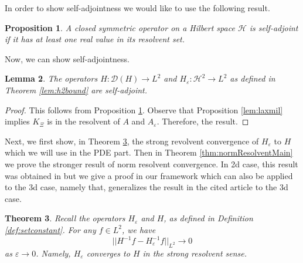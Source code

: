 \documentclass[11pt, oneside]{article}   	%
\newtheorem{theorem}{Theorem}[section]
\newtheorem{lemma}[theorem]{Lemma}
\newtheorem{proposition}[theorem]{Proposition}
\newcommand{\ssp}{\mathscr{H}}
\begin{document}
	In order to show self-adjointness we would like to use the following result.

\begin{proposition}\cite[X.1]{reedsimon2} \label{prop:selfadj}
	A closed symmetric operator on a Hilbert space $\mathcal{H}$ is self-adjoint if it has at least one real value in its resolvent set.
\end{proposition}

Now, we can show self-adjointness.  

\begin{lemma}
	\label{thm:2dselfadj}The operators $H : \mathscr{D}(H)
	\rightarrow L^2$ and $H_\varepsilon : \ssp^2
	\rightarrow L^2$ as defined in Theorem \ref{lem:h2bound} are self-adjoint.
\end{lemma}

\begin{proof}
	This follows from Proposition \ref{prop:selfadj}. Observe that Proposition \ref{lem:laxmil} implies  $K_\Xi$ is in the resolvent of $A$ and $A_\varepsilon$. Therefore, the result.
\end{proof}



Next, we first show, in Theorem \ref{thm:resoventConv1},  the strong  revolvent convergence of $H_\varepsilon$ to $H$ which we will use in the PDE part.  Then in Theorem \ref{thm:normResolventMain} we prove the stronger result of norm resolvent convergence. In 2d case, this result was obtained in   \cite[Lemma 4.15]{allez_continuous_2015} but we give a proof  in our framework which can also be applied to the 3d case, namely that, generalizes the result in the cited article to the 3d case.


		

	
	\begin{theorem} \label{thm:resoventConv1}
		Recall the operators $H_\varepsilon $ and  $H$, as defined in Definition \eqref{def:setconstant}.  For any $f \in L^2$, we have
		\[
		|| H^{-1} f - H_\varepsilon^{-1} f||_{L^2} \rightarrow 0
		\]
		as $\varepsilon \rightarrow 0$. Namely, $H_\varepsilon $ converges to $H$ in the strong resolvent  sense.
	\end{theorem}
	
\end{document}
